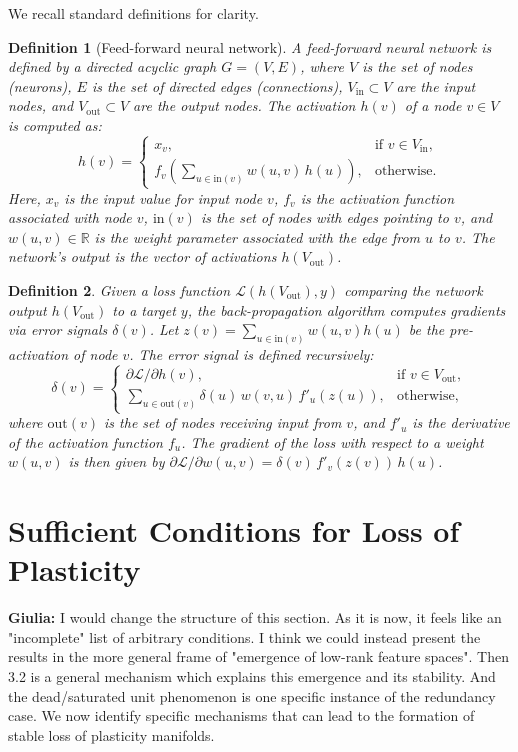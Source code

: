 \documentclass{article}
\newcommand{\Loss}{\mathcal{L}}
\newcommand{\R}{\mathbb{R}}
\newcommand{\giulia}[1]{{\color{ForestGreen}\textbf{Giulia:} #1}}
\newtheorem{definition}{Definition}[section]
\begin{document}
We recall standard definitions for clarity.

\begin{definition}[Feed-forward neural network]
A feed-forward neural network is defined by a directed acyclic graph $G=(V,E)$, where $V$ is the set of nodes (neurons), $E$ is the set of directed edges (connections), $V_{\text{in}} \subset V$ are the input nodes, and $V_{\text{out}} \subset V$ are the output nodes. The activation $h(v)$ of a node $v \in V$ is computed as:
\[
h(v)=
\begin{cases}
x_v, & \text{if } v\in V_{\text{in}},\\
f_v\!\left(\sum_{u\!\in\!\mathrm{in}(v)}w(u,v)\,h(u)\right), &\text{otherwise}.
\end{cases}
\]
Here, $x_v$ is the input value for input node $v$, $f_v$ is the activation function associated with node $v$, $\mathrm{in}(v)$ is the set of nodes with edges pointing to $v$, and $w(u,v) \in \R$ is the weight parameter associated with the edge from $u$ to $v$. The network's output is the vector of activations $h(V_{\text{out}})$.
\end{definition}

\begin{definition}
Given a loss function $\Loss(h(V_{\text{out}}),y)$ comparing the network output $h(V_{\text{out}})$ to a target $y$, the back-propagation algorithm computes gradients via error signals $\delta(v)$. Let $z(v) = \sum_{u\in\mathrm{in}(v)}w(u,v)h(u)$ be the pre-activation of node $v$. The error signal is defined recursively:
\[
\delta(v)=
\begin{cases}
\partial\Loss/\partial h(v), & \text{if } v\in V_{\text{out}},\\[4pt]
\displaystyle\sum_{u\in\mathrm{out}(v)}\delta(u)\,w(v,u)\,f'_u(z(u)), &\text{otherwise},
\end{cases}
\]
where $\mathrm{out}(v)$ is the set of nodes receiving input from $v$, and $f'_u$ is the derivative of the activation function $f_u$. The gradient of the loss with respect to a weight $w(u,v)$ is then given by $\partial\Loss/\partial w(u,v)=\delta(v)\,f'_v(z(v))\,h(u)$.\qedhere
\end{definition}

\section{Sufficient Conditions for Loss of Plasticity}
\label{sec:frozen}
\giulia{I would change the structure of this section. As it is now, it feels like an "incomplete" list of arbitrary conditions. I think we could instead present the results in the more general frame of "emergence of low-rank feature spaces". Then 3.2 is a general mechanism which explains this emergence and its stability. And the dead/saturated unit phenomenon is one specific instance of the redundancy case.}
We now identify specific mechanisms that can lead to the formation of stable loss of plasticity manifolds. 
\end{document}
